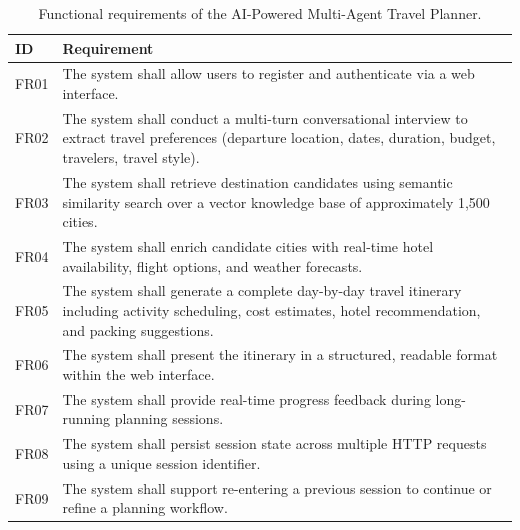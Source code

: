 \documentclass[12pt,a4paper]{report}
\begin{document}
\begin{table}[htbp]
\centering
\small
\renewcommand{\arraystretch}{1.3}
\begin{tabularx}{\textwidth}{
    >{\centering\arraybackslash}p{1.2cm}
    >{\raggedright\arraybackslash}X}
\toprule
\textbf{ID} & \textbf{Requirement} \\
\midrule
FR01 & The system shall allow users to register and authenticate via a web interface. \\
FR02 & The system shall conduct a multi-turn conversational interview to extract travel preferences (departure location, dates, duration, budget, travelers, travel style). \\
FR03 & The system shall retrieve destination candidates using semantic similarity search over a vector knowledge base of approximately 1{,}500 cities. \\
FR04 & The system shall enrich candidate cities with real-time hotel availability, flight options, and weather forecasts. \\
FR05 & The system shall generate a complete day-by-day travel itinerary including activity scheduling, cost estimates, hotel recommendation, and packing suggestions. \\
FR06 & The system shall present the itinerary in a structured, readable format within the web interface. \\
FR07 & The system shall provide real-time progress feedback during long-running planning sessions. \\
FR08 & The system shall persist session state across multiple HTTP requests using a unique session identifier. \\
FR09 & The system shall support re-entering a previous session to continue or refine a planning workflow. \\
\bottomrule
\end{tabularx}
\caption{Functional requirements of the AI-Powered Multi-Agent Travel Planner.}
\label{tab:bf}
\end{table}

\end{document}
